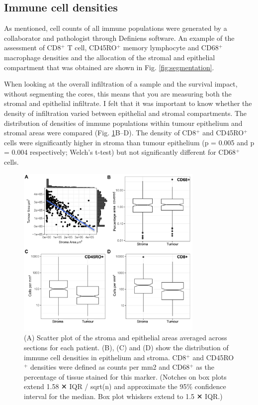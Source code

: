 \subsection{Immune cell densities}


As mentioned, cell counts of all immune populations were generated by a collaborator and pathologist through Definiens software. An example of the assessment of CD8$^+$ T cell, CD45RO$^+$ memory lymphocyte and CD68$^+$ macrophage densities and the allocation of the stromal and epithelial compartment that was obtained are shown in Fig. \ref{fig:segmentation}.

When looking at the overall infiltration of a sample and the survival impact, without segmenting the cores, this means that you are measuring both the stromal and epithelial infiltrate. I felt that it was important to know whether the density of infiltration varied between epithelial and stromal compartments. The distribution of densities of immune populations within tumour epithelium and stromal areas were compared (Fig. \ref{fig:distribution_infiltrate}B–D). The density of CD8$^+$ and CD45RO$^+$ cells were significantly higher in stroma than tumour epithelium (p = 0.005 and p = 0.004 respectively; Welch’s t-test) but not significantly different for CD68$^+$ cells. 

\begin{figure}
    \centering
    \includegraphics[width=0.8\textwidth]{Chapter2/Figs/Raster/plots_dist.png}
    \caption[Distribution of immune densities.]{ (A) Scatter plot of the stroma and epithelial  areas averaged across sections for each patient. (B), (C) and (D) show the distribution of immune cell densities in epithelium and stroma. CD8$^+$ and CD45RO$^+$ densities were defined as counts per mm2 and CD68$^+$ as the percentage of tissue stained for this marker. (Notches on box plots extend 1.58 ✕ IQR / sqrt(n) and approximate the 95\% confidence interval for the median. Box plot whiskers extend to 1.5 ✕ IQR.) 
}
    \label{fig:distribution_infiltrate}
\end{figure}

